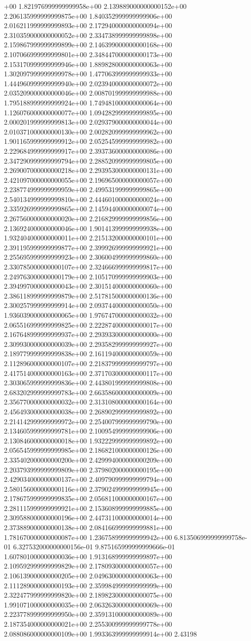 +00	1.821976999999999958e+00	2.139889000000000152e+00	2.206135999999999875e+00	1.840352999999999906e+00	2.016211999999999893e+00	2.172940000000000094e+00	2.310359000000000052e+00	2.334738999999999898e+00	2.159867999999999899e+00	2.146399000000000168e+00	2.107066999999999801e+00	2.348447000000000173e+00	2.153170999999999946e+00	1.889828000000000063e+00	1.302097999999999978e+00	1.477063999999999933e+00	1.444960999999999940e+00	2.023940000000000072e+00	2.035209000000000046e+00	2.008701999999999988e+00	1.795188999999999924e+00	1.749481000000000064e+00	1.126076000000000077e+00	1.094282999999999895e+00	2.000201999999999813e+00	2.029379000000000044e+00	2.010371000000000130e+00	2.002820999999999962e+00	1.901165999999999912e+00	2.052545999999999982e+00	2.229684999999999917e+00	2.393736000000000086e+00	2.347290999999999794e+00	2.288520999999999805e+00	2.269007000000000218e+00	2.293953000000000131e+00	2.421097000000000055e+00	2.196965000000000057e+00	2.238774999999999959e+00	2.499531999999999865e+00	2.540134999999999810e+00	2.444601000000000024e+00	2.335926999999999865e+00	2.145944000000000074e+00	2.267560000000000020e+00	2.216829999999999856e+00	2.136924000000000046e+00	1.901413999999999938e+00	1.932404000000000011e+00	2.215132000000000101e+00	2.391195999999999877e+00	2.399926999999999921e+00	2.255695999999999923e+00	2.306004999999999860e+00	2.330785000000000107e+00	2.324666999999999817e+00	2.249763000000000179e+00	2.105170999999999903e+00	2.394997000000000043e+00	2.301514000000000060e+00	2.386118999999999879e+00	2.517815000000000136e+00	2.300257999999999914e+00	2.093744000000000050e+00	1.936039000000000065e+00	1.976747000000000032e+00	2.065516999999999825e+00	2.222874000000000017e+00	2.167648999999999937e+00	2.293933000000000000e+00	2.309930000000000039e+00	2.293582999999999927e+00	2.189779999999999838e+00	2.161194000000000059e+00	2.112896000000000107e+00	2.218379999999999797e+00	2.417514000000000163e+00	2.371703000000000117e+00	2.303065999999999836e+00	2.443801999999999808e+00	2.683202999999999783e+00	2.663586000000000009e+00	2.356770000000000032e+00	2.313108000000000164e+00	2.456493000000000038e+00	2.268902999999999892e+00	2.214142999999999972e+00	2.254007999999999790e+00	2.134605999999999781e+00	2.100954999999999906e+00	2.130846000000000018e+00	1.932229999999999892e+00	2.056545999999999985e+00	2.186821000000000126e+00	2.335402000000000200e+00	2.429994000000000209e+00	2.203793999999999809e+00	2.379802000000000195e+00	2.429034000000000137e+00	2.409790999999999794e+00	2.580156000000000116e+00	2.379024999999999945e+00	2.178675999999999835e+00	2.056811000000000167e+00	2.281115999999999921e+00	2.153608999999999885e+00	2.309588000000000196e+00	2.447311000000000014e+00	2.373889000000000138e+00	2.084166999999999881e+00	1.781670000000000087e+00	1.236758999999999942e+00	6.813506999999999758e-01	6.327532000000000156e-01	9.875165999999999666e-01	1.607801000000000036e+00	1.913168999999999897e+00	2.109592999999999829e+00	2.178093000000000057e+00	2.106139000000000205e+00	2.049630000000000063e+00	2.111289000000000193e+00	2.359984999999999999e+00	2.322477999999999820e+00	2.189823000000000075e+00	1.991071000000000035e+00	2.063263000000000069e+00	2.223778999999999950e+00	2.359131000000000089e+00	2.187354000000000021e+00	2.255300999999999778e+00	2.088086000000000109e+00	1.993363999999999914e+00	2.43198